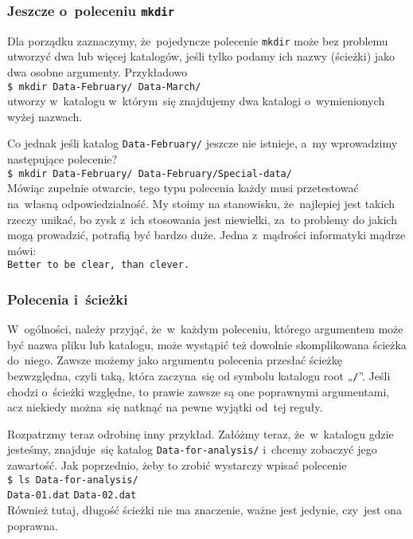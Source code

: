 \documentclass[10pt,t]{beamer}
\begin{document}
\begin{frame}
  \frametitle{Jeszcze o~poleceniu \texttt{mkdir}}


  Dla porządku zaznaczymy, że~pojedyncze polecenie \texttt{mkdir} może bez
  problemu utworzyć dwa lub więcej katalogów, jeśli tylko podamy ich nazwy
  (ścieżki) jako dwa osobne argumenty. Przykładowo \\
  \texttt{\$ mkdir Data-February/ Data-March/} \\
  utworzy w~katalogu w~którym~się znajdujemy dwa katalogi o~wymienionych
  wyżej nazwach.

  Co jednak jeśli katalog \texttt{Data-February/} jeszcze nie istnieje,
  a~my wprowadzimy następujące polecenie? \\
  \texttt{\$ mkdir Data-February/ Data-February/Special-data/} \\
  Mówiąc zupełnie otwarcie, tego typu polecenia każdy musi przetestować
  na~własną odpowiedzialność. My stoimy na stanowisku, że~najlepiej jest
  takich rzeczy unikać, bo zysk z~ich stosowania jest niewielki, za~to
  problemy do jakich mogą prowadzić, potrafią być bardzo duże. Jedna
  z~mądrości informatyki mądrze mówi: \\
  \texttt{Better to be clear, than clever.}

\end{frame}





\begin{frame}
  \frametitle{Polecenia i~ścieżki}


  W~ogólności, należy przyjąć, że~w~każdym poleceniu, którego argumentem
  może być nazwa pliku lub katalogu, może wystąpić też dowolnie
  skomplikowana ścieżka do~niego. Zawsze możemy jako argumentu polecenia
  przesłać ścieżkę bezwzględna, czyli taką, która zaczyna~się od symbolu
  katalogu root „\texttt{/}”. Jeśli chodzi o~ścieżki względne, to prawie
  zawsze są one poprawnymi argumentami, acz niekiedy można~się natknąć na
  pewne wyjątki od~tej reguły.

  Rozpatrzmy teraz odrobinę inny przykład. Załóżmy teraz, że~w~katalogu
  gdzie jesteśmy, znajduje~się katalog \texttt{Data-for-analysis/}
  i~chcemy zobaczyć jego zawartość. Jak poprzednio, żeby to zrobić wystarczy
  wpisać polecenie \\
  \texttt{\$ ls Data-for-analysis/} \\
  \texttt{Data-01.dat} \quad \texttt{Data-02.dat} \\
  Również tutaj, długość ścieżki nie ma znaczenie, ważne jest jedynie,
  czy~jest ona poprawna.

\end{frame}
\end{document}
